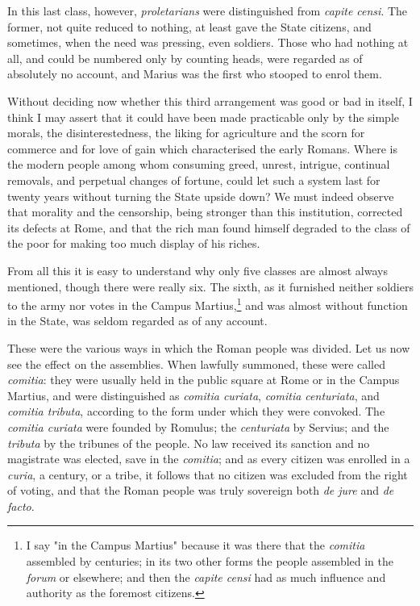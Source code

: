 \documentclass[12pt]{book}
\begin{document}
In this last class, however, \textit{proletarians} were distinguished from \textit{capite censi}. The former, not quite reduced to nothing, at least gave the State citizens, and sometimes, when the need was pressing, even soldiers. Those who had nothing at all, and could be numbered only by counting heads, were regarded as of absolutely no account, and Marius was the first who stooped to enrol them.

Without deciding now whether this third arrangement was good or bad in itself, I think I may assert that it could have been made practicable only by the simple morals, the disinterestedness, the liking for agriculture and the scorn for commerce and for love of gain which characterised the early Romans. Where is the modern people among whom consuming greed, unrest, intrigue, continual removals, and perpetual changes of fortune, could let such a system last for twenty years without turning the State upside down? We must indeed observe that morality and the censorship, being stronger than this institution, corrected its defects at Rome, and that the rich man found himself degraded to the class of the poor for making too much display of his riches.

From all this it is easy to understand why only five classes are almost always mentioned, though there were really six. The sixth, as it furnished neither soldiers to the army nor votes in the Campus Martius,\footnote{I say "in the Campus Martius" because it was there that the \textit{comitia} assembled by centuries; in its two other forms the people assembled in the \textit{forum} or elsewhere; and then the \textit{capite censi} had as much influence and authority as the foremost citizens.} and was almost without function in the State, was seldom regarded as of any account.

These were the various ways in which the Roman people was divided. Let us now see the effect on the assemblies. When lawfully summoned, these were called \textit{comitia}: they were usually held in the public square at Rome or in the Campus Martius, and were distinguished as \textit{comitia curiata}, \textit{comitia centuriata}, and \textit{comitia tributa}, according to the form under which they were convoked. The \textit{comitia curiata} were founded by Romulus; the \textit{centuriata} by Servius; and the \textit{tributa} by the tribunes of the people. No law received its sanction and no magistrate was elected, save in the \textit{comitia}; and as every citizen was enrolled in a \textit{curia}, a century, or a tribe, it follows that no citizen was excluded from the right of voting, and that the Roman people was truly sovereign both \textit{de jure} and \textit{de facto}.
\end{document}
